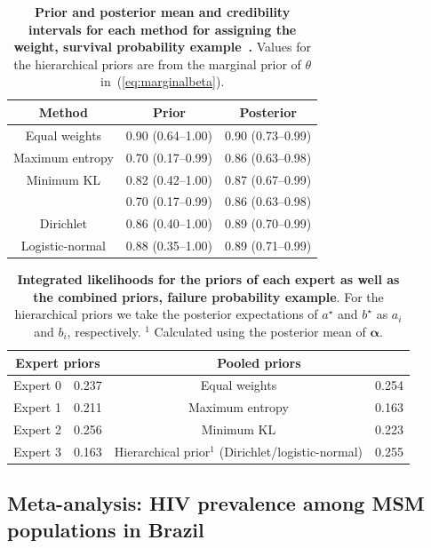 \documentclass[12pt]{article}
\begin{document}
\begin{table}[ht]
\caption{\textbf{Prior and posterior mean and credibility intervals for each method for assigning the weight, survival probability example~\parencite{Savchuk1994}.}
Values for the hierarchical priors are from the marginal prior of $\theta$ in~(\ref{eq:marginalbeta}).
}
\centering
\begin{tabular}{ccc}
 \hline
Method & Prior & Posterior  \\ 
 \hline
 Equal weights & 0.90 (0.64--1.00) & 0.90 (0.73--0.99) \\ 
 Maximum entropy &  0.70 (0.17--0.99) & 0.86 (0.63--0.98) \\ 
 Minimum KL  &  0.82 (0.42--1.00) & 0.87 (0.67--0.99) \\ 
 \textcite{Rufo2012B} & 0.70 (0.17--0.99) & 0.86 (0.63--0.98)\\
 Dirichlet  & 0.86 (0.40--1.00) & 0.89 (0.70--0.99) \\ 
 Logistic-normal & 0.88 (0.35--1.00) & 0.89 (0.71--0.99) \\ 
  \hline
\end{tabular}
\label{tab:prior_posteriorsSavchuk}
\end{table}


\begin{table}[ht]
\caption{\textbf{Integrated likelihoods for the priors of each expert as well as the combined priors, failure probability example}.
For the hierarchical priors we take the posterior expectations of $a^\star$ and $b^\star$ as $a_i$ and $b_i$, respectively.
$^1$ Calculated using the posterior mean of $\boldsymbol\alpha$. }
\centering
\begin{tabular}{cccc}
   \hline
   \multicolumn{2}{c}{Expert priors} &  \multicolumn{2}{c}{Pooled priors} \\
   \hline
   Expert 0 & 0.237 & Equal weights & 0.254\\
   Expert 1 & 0.211 & Maximum entropy & 0.163 \\
   Expert 2 & 0.256 & Minimum KL & 0.223 \\ 
   Expert 3 & 0.163 & Hierarchical prior$^1$ (Dirichlet/logistic-normal) & 0.255 \\
   \hline
\end{tabular}
\label{tab:marglikes}
\end{table}

\subsection{Meta-analysis: HIV prevalence among MSM populations in Brazil}
\label{sec:metaAnalysis}
\end{document}
